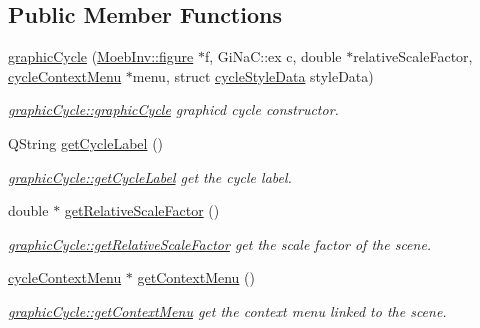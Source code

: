 \subsection*{Public Member Functions}
\begin{DoxyCompactItemize}
\item 
\mbox{\hyperlink{classgraphic_cycle_a89c2914fab32a0e10b2d53491535c173}{graphic\+Cycle}} (\mbox{\hyperlink{class_moeb_inv_1_1figure}{Moeb\+Inv\+::figure}} $\ast$f, Gi\+Na\+C\+::ex c, double $\ast$relative\+Scale\+Factor, \mbox{\hyperlink{classcycle_context_menu}{cycle\+Context\+Menu}} $\ast$menu, struct \mbox{\hyperlink{structcycle_style_data}{cycle\+Style\+Data}} style\+Data)
\begin{DoxyCompactList}\small\item\em \mbox{\hyperlink{classgraphic_cycle_a89c2914fab32a0e10b2d53491535c173}{graphic\+Cycle\+::graphic\+Cycle}} graphicd cycle constructor. \end{DoxyCompactList}\item 
Q\+String \mbox{\hyperlink{classgraphic_cycle_ae55bb7487a8baac738b88e8c1bd0515e}{get\+Cycle\+Label}} ()
\begin{DoxyCompactList}\small\item\em \mbox{\hyperlink{classgraphic_cycle_ae55bb7487a8baac738b88e8c1bd0515e}{graphic\+Cycle\+::get\+Cycle\+Label}} get the cycle label. \end{DoxyCompactList}\item 
double $\ast$ \mbox{\hyperlink{classgraphic_cycle_a80b533c2477a08f98506202d94bad7bc}{get\+Relative\+Scale\+Factor}} ()
\begin{DoxyCompactList}\small\item\em \mbox{\hyperlink{classgraphic_cycle_a80b533c2477a08f98506202d94bad7bc}{graphic\+Cycle\+::get\+Relative\+Scale\+Factor}} get the scale factor of the scene. \end{DoxyCompactList}\item 
\mbox{\hyperlink{classcycle_context_menu}{cycle\+Context\+Menu}} $\ast$ \mbox{\hyperlink{classgraphic_cycle_a4e090d82ba2e37bee415c95630abe061}{get\+Context\+Menu}} ()
\begin{DoxyCompactList}\small\item\em \mbox{\hyperlink{classgraphic_cycle_a4e090d82ba2e37bee415c95630abe061}{graphic\+Cycle\+::get\+Context\+Menu}} get the context menu linked to the scene. \end{DoxyCompactList}\item 
\mbox{\label{classgraphic_cycle_a10e61352945ca9b32b83e528e2fc6853}} 

\end{DoxyCompactItemize}
